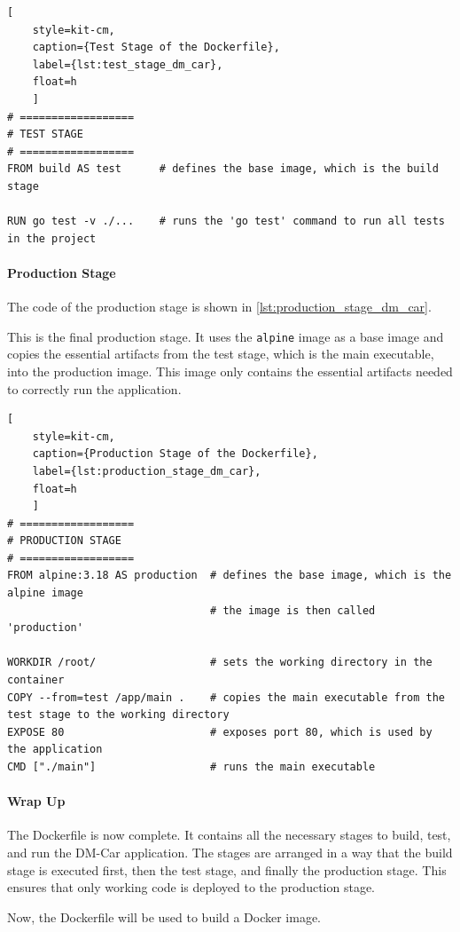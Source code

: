 \begin{lstlisting}[
    style=kit-cm,
    caption={Test Stage of the Dockerfile},
    label={lst:test_stage_dm_car},
    float=h
    ]
# ==================
# TEST STAGE
# ==================
FROM build AS test      # defines the base image, which is the build stage

RUN go test -v ./...    # runs the 'go test' command to run all tests in the project
\end{lstlisting}

\paragraph*{Production Stage}
The code of the production stage is shown in \autoref*{lst:production_stage_dm_car}.

This is the final production stage.
It uses the \texttt{alpine} image as a base image and copies the essential artifacts from the test stage, which is the main executable, into the production image.
This image only contains the essential artifacts needed to correctly run the application.

\begin{lstlisting}[
    style=kit-cm,
    caption={Production Stage of the Dockerfile},
    label={lst:production_stage_dm_car},
    float=h
    ]
# ==================
# PRODUCTION STAGE
# ==================
FROM alpine:3.18 AS production  # defines the base image, which is the alpine image
                                # the image is then called 'production'

WORKDIR /root/                  # sets the working directory in the container
COPY --from=test /app/main .    # copies the main executable from the test stage to the working directory
EXPOSE 80                       # exposes port 80, which is used by the application
CMD ["./main"]                  # runs the main executable
\end{lstlisting}

\paragraph*{Wrap Up}
The Dockerfile is now complete.
It contains all the necessary stages to build, test, and run the DM-Car application.
The stages are arranged in a way that the build stage is executed first, then the test stage, and finally the production stage.
This ensures that only working code is deployed to the production stage.

Now, the Dockerfile will be used to build a Docker image.


